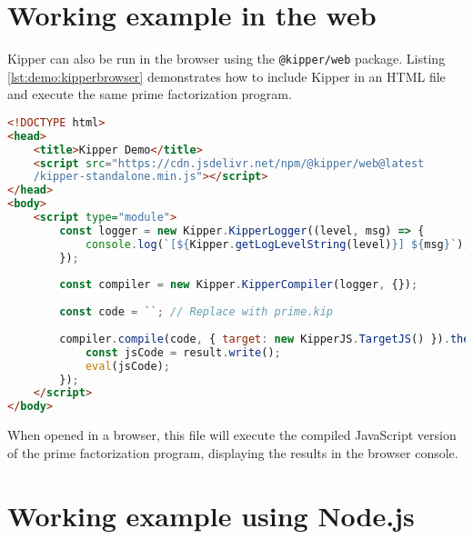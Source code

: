 \section{Working example in the web}
Kipper can also be run in the browser using the \texttt{@kipper/web} package. Listing \ref{lst:demo:kipperbrowser} demonstrates how to include Kipper in an HTML file and execute the same prime factorization program.

\begin{lstlisting}[language=HTML,caption=Running Kipper in the browser, label=lst:demo:kipperbrowser]
<!DOCTYPE html>
<head>
	<title>Kipper Demo</title>
	<script src="https://cdn.jsdelivr.net/npm/@kipper/web@latest
	/kipper-standalone.min.js"></script>
</head>
<body>
	<script type="module">
		const logger = new Kipper.KipperLogger((level, msg) => {
			console.log(`[${Kipper.getLogLevelString(level)}] ${msg}`);
		});
		
		const compiler = new Kipper.KipperCompiler(logger, {});
		
		const code = ``; // Replace with prime.kip
		
		compiler.compile(code, { target: new KipperJS.TargetJS() }).then((result) => {
			const jsCode = result.write();
			eval(jsCode);
		});
	</script>
</body>
\end{lstlisting}

When opened in a browser, this file will execute the compiled JavaScript version of the prime factorization program, displaying the results in the browser console.

\section{Working example using Node.js}


